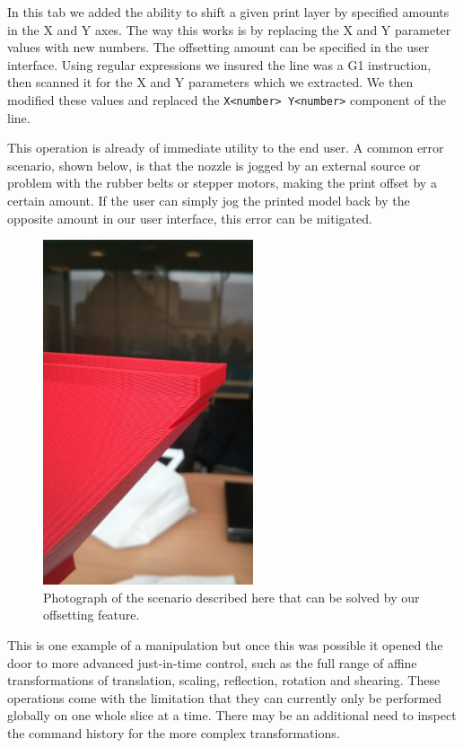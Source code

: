 \documentclass[pdftex, 11pt]{report} %
\begin{document}
In this tab we added the ability to shift a given print layer by specified amounts in the X and Y axes. The way this works is by replacing the X and Y parameter values with new numbers. The offsetting amount can be specified in the user interface. Using regular expressions we insured the line was a G1 instruction, then scanned it for the X and Y parameters which we extracted. We then modified these values and replaced the \verb|X<number> Y<number>| component of the line.

This operation is already of immediate utility to the end user. A common error scenario, shown below, is that the nozzle is jogged by an external source or problem with the rubber belts or stepper motors, making the print offset by a certain amount. If the user can simply jog the printed model back by the opposite amount in our user interface, this error can be mitigated.

\begin{figure}[H]
  \centering
  \includegraphics[height=4in]{FoggerOffset.png}
  \caption{Photograph of the scenario described here that can be solved by our offsetting feature.}
  \label{figure:FoggerOffset}
\end{figure}

This is one example of a manipulation but once this was possible it opened the door to more advanced just-in-time control, such as the full range of affine transformations of translation, scaling, reflection, rotation and shearing. These operations come with the limitation that they can currently only be performed globally on one whole slice at a time. There may be an additional need to inspect the command history for the more complex transformations.
\end{document}
